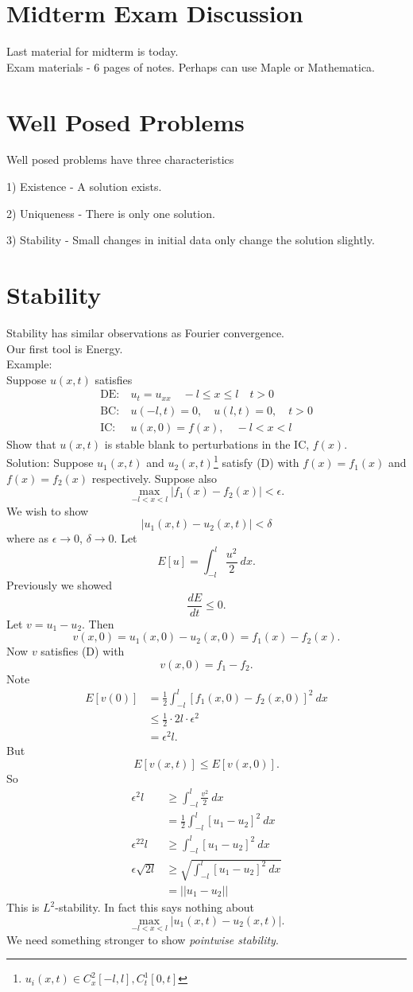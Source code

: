 \documentclass[cm]{article}
\begin{document}
\section{Midterm Exam Discussion}
Last material for midterm is today.\\
Exam materials - 6 pages of notes. Perhaps can use Maple or Mathematica.
\section{Well Posed Problems}
Well posed problems have three characteristics
\enum
\item[1)] Existence - A solution exists.
\item[2)] Uniqueness - There is only one solution.
\item[3)] Stability - Small changes in initial data only change the solution slightly.
\xenum
\section{Stability}
Stability has similar observations as Fourier convergence.\\
Our first tool is Energy.\\
Example:\\
Suppose $u(x,t)$ satisfies
\begin{align*}
\text{DE:}&~u_t = u_{xx} \quad -l \leq x \leq l \quad t > 0 \\
\text{BC:}&~u(-l,t) = 0, \quad u(l,t) = 0, \quad t > 0 \tag{D}\\
\text{IC:}&~u(x,0) = f(x), \quad -l < x < l
\end{align*}
Show that $u(x,t)$ is stable blank to perturbations in the IC, $f(x)$.\\
Solution: Suppose $u_1(x,t)$ and $u_2(x,t)$\footnote{$u_i(x,t) \in C_x^2[-l,l],C_t^1[0,t]$} satisfy (D) with $f(x) = f_1(x)$ and $f(x) = f_2(x)$ respectively. Suppose also
$$\max_{-l < x < l} |f_1(x) - f_2(x)| < \epsilon.$$
We wish to show $$|u_1(x,t) - u_2(x,t)| < \delta$$ where as $\epsilon \to 0$, $\delta \to 0$. Let
$$E[u] = \int_{-l}^{l} \frac{u^2}{2}~dx.$$
Previously we showed $$\frac{dE}{dt} \leq 0.$$
Let $v = u_1 - u_2$. Then $$v(x,0) = u_1(x,0) - u_2(x,0) = f_1(x) - f_2(x).$$
Now $v$ satisfies (D) with $$v(x,0) = f_1 - f_2.$$
Note 
\begin{align*}
E[v(0)] &= \frac12 \int_{-l}^l [f_1(x,0) - f_2(x,0)]^2~dx \\
&\leq \frac12 \cdot 2l \cdot \epsilon^2 \\
&= \epsilon^2 l.
\end{align*}
But
$$E[v(x,t)] \leq E[v(x,0)].$$
So
\begin{align*}
\epsilon^2l &\geq \int_{-l}^l \frac{v^2}{2}~dx \\
&= \frac12 \int_{-l}^l [u_1 - u_2]^2 ~dx\\
\epsilon^22l &\geq \int_{-l}^l [u_1 - u_2]^2~dx \\
\epsilon \sqrt{2l} &\geq \sqrt{\int_{-l}^l[u_1 - u_2]^2~dx} \\
&= ||u_1 - u_2||
\end{align*}
This is $L^2$-stability. In fact this says nothing about
$$\max_{-l < x < l} |u_1(x,t) - u_2(x,t)|.$$
We need something stronger to show \emph{pointwise stability}.
\end{document}
